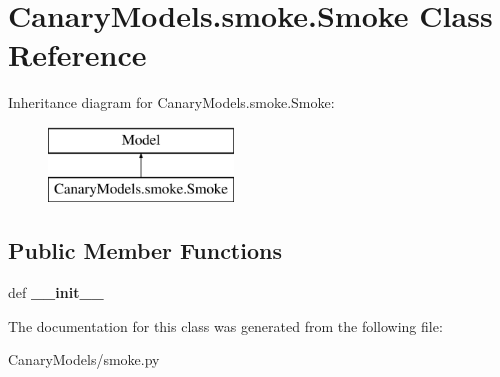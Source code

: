 \hypertarget{class_canary_models_1_1smoke_1_1_smoke}{\section{Canary\-Models.\-smoke.\-Smoke Class Reference}
\label{class_canary_models_1_1smoke_1_1_smoke}
}
Inheritance diagram for Canary\-Models.\-smoke.\-Smoke\-:\begin{figure}[H]
\begin{center}
\leavevmode
\includegraphics[height=2.000000cm]{class_canary_models_1_1smoke_1_1_smoke}
\end{center}
\end{figure}
\subsection*{Public Member Functions}
\begin{DoxyCompactItemize}
\item 
\hypertarget{class_canary_models_1_1smoke_1_1_smoke_a665b53f2032ebcfe67adeccc66a48539}{def {\bfseries \-\_\-\-\_\-init\-\_\-\-\_\-}}\label{class_canary_models_1_1smoke_1_1_smoke_a665b53f2032ebcfe67adeccc66a48539}

\end{DoxyCompactItemize}


The documentation for this class was generated from the following file\-:\begin{DoxyCompactItemize}
\item 
Canary\-Models/smoke.\-py\end{DoxyCompactItemize}
